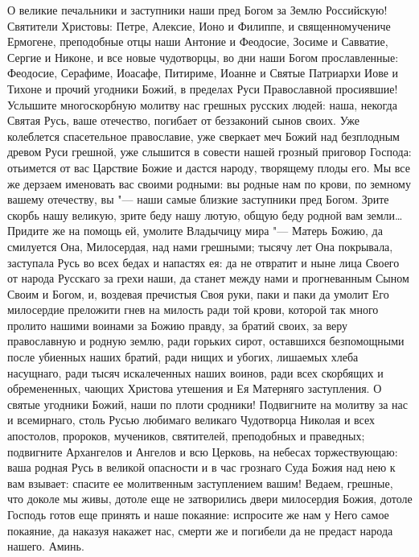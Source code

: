 \begin{mymulticols}



О великие печальники и заступники наши пред Богом за Землю Российскую! Святители Христовы: Петре, Алексие, Ионо и Филиппе, и священномучениче Ермогене, преподобные отцы наши Антоние и Феодосие, Зосиме и Савватие, Сергие и Никоне, и все новые чудотворцы, во дни наши Богом прославленные: Феодосие, Серафиме, Иоасафе, Питириме, Иоанне и Святые Патриархи Иове и Тихоне и прочий угодники Божий, в пределах Руси Православной просиявшие! Услышите многоскорбную молитву нас грешных русских людей: наша, некогда Святая Русь, ваше отечество, погибает от беззаконий сынов своих. Уже колеблется спасетельное православие, уже сверкает меч Божий над безплодным древом Руси грешной, уже слышится в совести нашей грозный приговор Господа: отьимется от вас Царствие Божие и дастся народу, творящему плоды его. Мы все же дерзаем именовать вас своими родными: вы родные нам по крови, по земному вашему отечеству, вы "--- наши самые близкие заступники пред Богом. Зрите скорбь нашу великую, зрите беду нашу лютую, общую беду родной вам земли… Придите же на помощь ей, умолите Владычицу мира "--- Матерь Божию, да смилуется Она, Милосердая, над нами грешными; тысячу лет Она покрывала, заступала Русь во всех бедах и напастях ея: да не отвратит и ныне лица Своего от народа Русскаго за грехи наши, да станет между нами и прогневанным Сыном Своим и Богом, и, воздевая пречистыя Своя руки, паки и паки да умолит Его милосердие преложити гнев на милость ради той крови, которой так много пролито нашими воинами за Божию правду, за братий своих, за веру православную и родную землю, ради горьких сирот, оставшихся безпомощными после убиенных наших братий, ради нищих и убогих, лишаемых хлеба насущнаго, ради тысяч искалеченных наших воинов, ради всех скорбящих и обремененных, чающих Христова утешения и Ея Матерняго заступления. О святые угодники Божий, наши по плоти сродники! Подвигните на молитву за нас и всемирнаго, столь Русью любимаго великаго Чудотворца Николая и всех апостолов, пророков, мучеников, святителей, преподобных и праведных; подвигните Архангелов и Ангелов и всю Церковь, на небесах торжествующаю: ваша родная Русь в великой опасности и в час грознаго Суда Божия над нею к вам взывает: спасите ее молитвенным заступлением вашим! Ведаем, грешные, что доколе мы живы, дотоле еще не затворились двери милосердия Божия, дотоле Господь готов еще принять и наше покаяние: испросите же нам у Него самое покаяние, да наказуя накажет нас, смерти же и погибели да не предаст народа нашего. Аминь.

\end{mymulticols}

